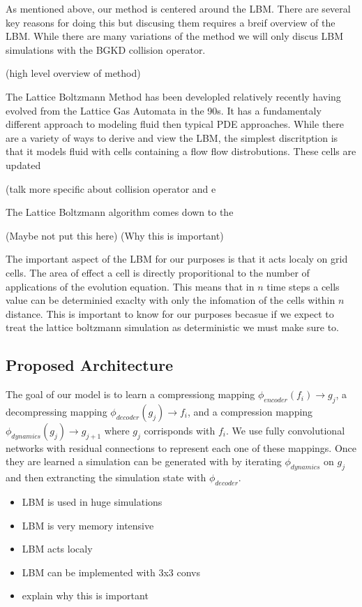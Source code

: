 \documentclass{article}
\begin{document}
As mentioned above, our method is centered around the LBM. There are several key reasons for doing this but discusing them requires a breif overview of the LBM. While there are many variations of the method we will only discus LBM simulations with the BGKD collision operator. 

(high level overview of method)

The Lattice Boltzmann Method has been developled relatively recently having evolved from the Lattice Gas Automata in the 90s. It has a fundamentaly different approach to modeling fluid then typical PDE approaches. While there are a variety of ways to derive and view the LBM, the simplest discritption is that it models fluid with cells containing a flow flow distrobutions. These cells are updated 

(talk more specific about collision operator and e

The Lattice Boltzmann algorithm comes down to the 

(Maybe not put this here)
(Why this is important)

The important aspect of the LBM for our purposes is that it acts localy on grid cells. The area of effect a cell is directly proporitional to the number of applications of the evolution equation. This means that in $n$ time steps a cells value can be determinied exaclty with only the infomation of the cells within $n$ distance. This is important to know for our purposes becasue if we expect to treat the lattice boltzmann simulation as deterministic we must make sure to. 

\subsection{Proposed Architecture}

The goal of our model is to learn a compressiong mapping $\phi_{encoder}(f_i) \rightarrow g_j$, a decompressing mapping $\phi_{decoder}(g_j) \rightarrow f_i$, and a compression mapping $\phi_{dynamics}(g_j) \rightarrow g_{j+1}$ where $g_j$ corrisponds with $f_i$. We use fully convolutional networks with residual connections to represent each one of these mappings. Once they are learned a simulation can be generated with by iterating $\phi_{dynamics}$ on $g_j$ and then extrancting the simulation state with $\phi_{decoder}$. 


\begin{itemize}
  \item LBM is used in huge simulations
  \item LBM is very memory intensive
  \item LBM acts localy
  \item LBM can be implemented with 3x3 convs
  \item explain why this is important
\end{itemize}
\end{document}
